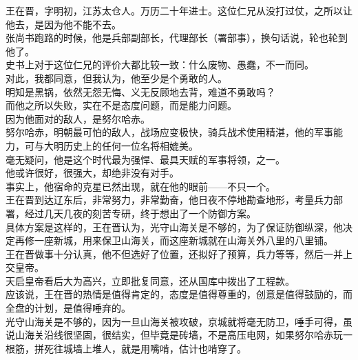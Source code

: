 \begin{multicols}{\theparacolNo}
王在晋，字明初，江苏太仓人。万历二十年进士。这位仁兄从没打过仗，之所以让他去，是因为他不能不去。\\

张尚书跑路的时候，他是兵部副部长，代理部长（署部事），换句话说，轮也轮到他了。\\

史书上对于这位仁兄的评价大都比较一致：什么废物、愚蠢，不一而同。\\

对此，我都同意，但我认为，他至少是个勇敢的人。\\

明知是黑锅，依然无怨无悔、义无反顾地去背，难道不勇敢吗？\\

而他之所以失败，实在不是态度问题，而是能力问题。\\

因为他面对的敌人，是努尔哈赤。\\

努尔哈赤，明朝最可怕的敌人，战场应变极快，骑兵战术使用精湛，他的军事能力，可与大明历史上的任何一位名将相媲美。\\

毫无疑问，他是这个时代最为强悍、最具天赋的军事将领，之一。\\

他或许很好，很强大，却绝非没有对手。\\

事实上，他宿命的克星已然出现，就在他的眼前——不只一个。\\

王在晋到达辽东后，非常努力，非常勤奋，他日夜不停地勘查地形，考量兵力部署，经过几天几夜的刻苦专研，终于想出了一个防御方案。\\

具体方案是这样的，王在晋认为，光守山海关是不够的，为了保证防御纵深，他决定再修一座新城，用来保卫山海关，而这座新城就在山海关外八里的八里铺。\\

王在晋做事十分认真，他不但选好了位置，还拟好了预算，兵力等等，然后一并上交皇帝。\\

天启皇帝看后大为高兴，立即批复同意，还从国库中拨出了工程款。\\

应该说，王在晋的热情是值得肯定的，态度是值得尊重的，创意是值得鼓励的，而全盘的计划，是值得唾弃的。\\

光守山海关是不够的，因为一旦山海关被攻破，京城就将毫无防卫，唾手可得，虽说山海关沿线很坚固，很结实，但毕竟是砖墙，不是高压电网，如果努尔哈赤玩一根筋，拼死往城墙上堆人，就是用嘴啃，估计也啃穿了。\\


\end{multicols}
